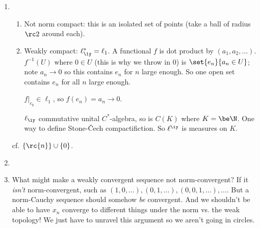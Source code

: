 \begin{enumerate}
\begin{enumerate}
\end{enumerate}

\item
\begin{enumerate}
\item
Not norm compact: this is an isolated set of points (take a ball of radius $\rc2$ around each).
\item
Weakly compact: $\ell_{\iy}^*=\ell_1$. A functional $f$ is dot product by $(a_1,a_2,\ldots)$. $f^{-1} (U)$ where $0\in U$ (this is why we throw in 0) is $\set{e_n}{a_n\in U}$; note $a_n\to 0$ so this contains $e_n$ for $n$ large enough. So one open set contains $e_n$ for all $n$ large enough. 


$f|_{c_0}\in \ell_1$, so $f(e_n)=a_n\to 0$.

$\ell_{\iy}$ commutative unital $C^*$-algebra, so is $C(K)$ where $K=\be \N$. One way to define Stone-\v Cech  compactifiction. So $\ell^{\iy}$ is measures on $K$.
\end{enumerate}
cf. $\{\rc{n}\}\cup\{0\}$.
\item {}
\item {}
What might make a weakly convergent sequence not norm-convergent? If it {\it isn't} norm-convergent, such as $(1,0,\ldots),(0,1,\ldots), (0,0,1,\ldots),\ldots$. But a norm-Cauchy sequence should somehow {\it be} convergent. And we shouldn't be able to have $x_n$ converge to different things under the norm vs. the weak topology! We just have to unravel this argument so we aren't going in circles.


\end{enumerate}
